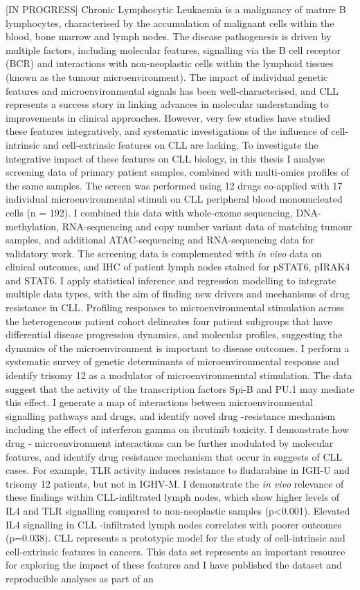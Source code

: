 \documentclass[11pt, a4paper, twosided]{book}
\begin{document}
    {[}IN PROGRESS{]}
    Chronic Lymphocytic Leukaemia is a malignancy of mature B lymphocytes, characterised by the accumulation of malignant cells within the blood, bone marrow and lymph nodes. The disease pathogenesis is driven by multiple factors, including molecular features, signalling via the B cell receptor (BCR) and interactions with non-neoplastic cells within the lymphoid tissues (known as the tumour microenvironment). The impact of individual genetic features and microenvironmental signals has been well-characterised, and CLL represents a success story in linking advances in molecular understanding to improvements in clinical approaches. However, very few studies have studied these features integratively, and systematic investigations of the influence of cell-intrinsic and cell-extrinsic features on CLL are lacking. To investigate the integrative impact of these features on CLL biology, in this thesis I analyse screening data of primary patient samples, combined with multi-omics profiles of the same samples. The screen was performed using 12 drugs co-applied with 17 individual microenvironmental stimuli on CLL peripheral blood mononucleated cells (n = 192). I combined this data with whole-exome sequencing, DNA-methylation, RNA-sequencing and copy number variant data of matching tumour samples, and additional ATAC-sequencing and RNA-sequencing data for validatory work. The screening data is complemented with \emph{in vivo} data on clinical outcomes, and IHC of patient lymph nodes stained for pSTAT6, pIRAK4 and STAT6. I apply statistical inference and regression modelling to integrate multiple data types, with the aim of finding new drivers and mechanisms of drug resistance in CLL. Profiling responses to microenvironmental stimulation across the heterogeneous patient cohort delineates four patient subgroups that have differential disease progression dynamics, and molecular profiles, suggesting the dynamics of the microenvironment is important to disease outcomes. I perform a systematic survey of genetic determinants of microenvironmental response and identify trisomy 12 as a modulator of microenvironmenntal stimulation. The data suggest that the activity of the transcription factors Spi-B and PU.1 may mediate this effect. I generate a map of interactions between microenvironmental signalling pathways and drugs, and identify novel drug -resistance mechanism including the effect of interferon gamma on ibrutinib toxicity. I demonstrate how drug - microenvironment interactions can be further modulated by molecular features, and identify drug resistance mechanism that occur in suggests of CLL cases. For example, TLR activity induces resistance to fludarabine in IGH-U and trisomy 12 patients, but not in IGHV-M. I demonstrate the \emph{in vivo} relevance of these findings within CLL-infiltrated lymph nodes, which show higher levels of IL4 and TLR signalling compared to non-neoplastic samples (p\textless0.001). Elevated IL4 signalling in CLL -infiltrated lymph nodes correlates with poorer outcomes (p=0.038). CLL represents a prototypic model for the study of cell-intrinsic and cell-extrinsic features in cancers. This data set represents an important resource for exploring the impact of these features and I have published the dataset and reproducible analyses as part of an 
\end{document}

